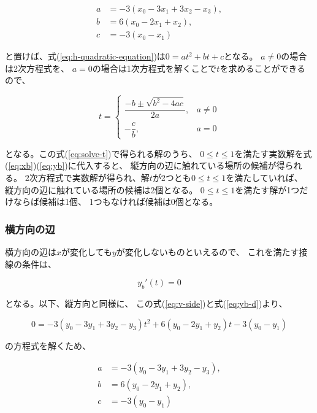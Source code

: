 \documentclass[dvipdfmx]{jsarticle}
\begin{document}
\begin{align}
  a &= -3\left( x_0 -3x_1 +3x_2 -x_3 \right), \\
  b &= 6\left( x_0 -2x_1 + x_2 \right), \\
  c &= -3\left( x_0 - x_1 \right)
\end{align}

と置けば、式(\ref{eq:h-quadratic-equation})は$0=at^2+bt+c$となる。
$a\neq 0$の場合は2次方程式を、
$a=0$の場合は1次方程式を解くことで$t$を求めることができるので、

\begin{equation}
  t=
  \begin{cases}
    \dfrac{-b\pm\sqrt{b^2-4ac}}{2a}, & a\neq 0 \\
    -\dfrac{c}{b}, & a=0
  \end{cases}
  \label{eq:solve-t}
\end{equation}

となる。この式(\ref{eq:solve-t})で得られる解のうち、
$0\leq t\leq 1$を満たす実数解を式(\ref{eq:xb})(\ref{eq:yb})に代入すると、
縦方向の辺に触れている場所の候補が得られる。
2次方程式で実数解が得られ、解$t$が2つとも$0\leq t\leq 1$を満たしていれば、
縦方向の辺に触れている場所の候補は2個となる。
$0\leq t\leq 1$を満たす解が1つだけならば候補は1個、
1つもなければ候補は0個となる。

\subsubsection{横方向の辺}

横方向の辺は$x$が変化しても$y$が変化しないものといえるので、
これを満たす接線の条件は、

\begin{equation}
  y_b{}'\left(t\right) = 0
  \label{eq:v-side}
\end{equation}

となる。以下、縦方向と同様に、
この式(\ref{eq:v-side})と式(\ref{eq:yb-d})より、

\begin{equation}
  0
  =
  -3\left( y_0 -3y_1 +3y_2 -y_3 \right) t^2
  +6\left( y_0 -2y_1 + y_2 \right) t
  -3\left( y_0 - y_1 \right)
\end{equation}

の方程式を解くため、

\begin{align}
  a &= -3\left( y_0 -3y_1 +3y_2 -y_3 \right), \\
  b &= 6\left( y_0 -2y_1 + y_2 \right), \\
  c &= -3\left( y_0 - y_1 \right)
\end{align}
\end{document}
